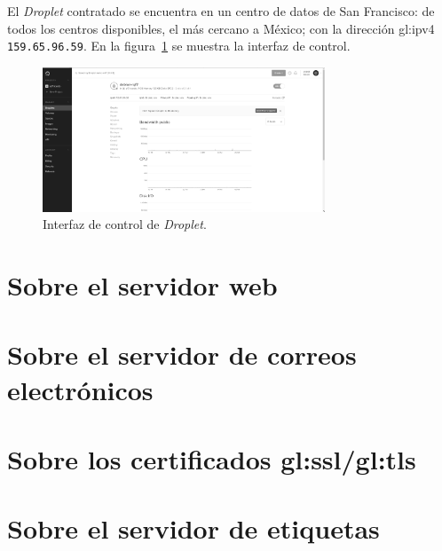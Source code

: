 El \textit{Droplet} contratado se encuentra en un centro de datos de San
Francisco: de todos los centros disponibles, el más cercano a México; con
la dirección \gls{gl:ip}v4 \texttt{159.65.96.59}. En la
figura~\ref{fig:digital_ocean} se muestra la interfaz de control.

\begin{figure}
  \begin{center}
    \includegraphics[width=0.75\textwidth]{diagramas/digital_ocean.png}
    \caption{Interfaz de control de \textit{Droplet}.}
    \label{fig:digital_ocean}
  \end{center}
\end{figure}

\section{Sobre el servidor web}

\section{Sobre el servidor de correos electrónicos}

\section{Sobre los certificados \texorpdfstring{%
  \acrshort{gl:ssl}/\acrshort{gl:tls}}{SSL/TLS}}

\section{Sobre el servidor de etiquetas}
